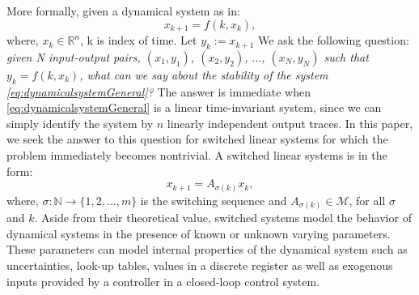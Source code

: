 \documentclass[letterpaper, 10 pt, conference]{ieeeconf}  %
\newcommand{\R}{\mathbb{R} }
\newcommand{\N}{\mathbb{N} }
\newcommand{\calM}{\mathcal{M}}
\begin{document}
More formally, given a dynamical system as in:
\begin{equation}\label{eq:dydnamicalsystemGeneral}x_{k+1} = f(k, x_k),
\end{equation}
where, $x_k \in \R^n$, k is index of time. Let $y_k := x_{k+1}$
We ask the following question: \emph{
given N input-output pairs, $(x_1, y_1)$, $(x_2, y_2)$, $\ldots$, $(x_N, y_N)$ such that $y_{k} = f(k, x_k)$, what can we say about the stability of the system \eqref{eq:dynamicalsystemGeneral}?} The answer is immediate when \eqref{eq:dynamicalsystemGeneral} is a linear time-invariant system, since we can simply identify the system by $n$ linearly independent output traces. In this paper, we seek the answer to this question for switched linear systems for which the problem immediately becomes nontrivial. A switched linear systems is in the form:
\begin{equation}\label{eq:switchedSystem}x_{k+1} = A_{\sigma(k)}x_k,\end{equation}
where, $\sigma: \N \to \{1,2, \ldots, m\}$ is the switching sequence and $A_{\sigma(k)} \in \calM$, for all $\sigma$ and $k$. Aside from their theoretical value, switched systems model the behavior of dynamical systems in the presence of known or unknown varying parameters. These parameters can model internal properties of the dynamical system such as uncertainties, look-up tables, values in a discrete register as well as exogenous inputs provided by a controller in a closed-loop control system. 
\end{document}
